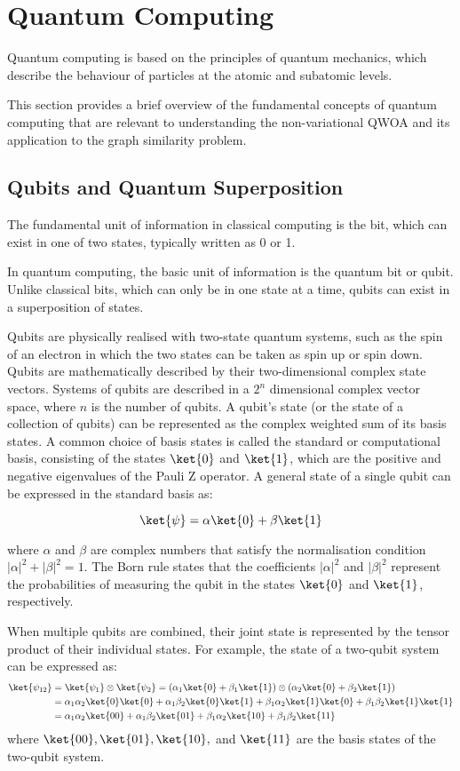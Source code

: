 \section{Quantum Computing}
Quantum computing is based on the principles of quantum mechanics, which describe the behaviour of particles at the atomic and subatomic levels.

This section provides a brief overview of the fundamental concepts of quantum computing that are relevant to understanding the non-variational QWOA and its application to the graph similarity problem. 

\subsection{Qubits and Quantum Superposition}

The fundamental unit of information in classical computing is the bit, which can exist in one of two states, typically written as 0 or 1.

In quantum computing, the basic unit of information is the quantum bit or qubit. Unlike classical bits, which can only be in one state at a time, qubits can exist in a superposition of states.

Qubits are physically realised with two-state quantum systems, such as the spin of an electron in which the two states can be taken as spin up or spin down. Qubits are mathematically described by their two-dimensional complex state vectors. Systems of qubits are described in a $2^n$ dimensional complex vector space, where $n$ is the number of qubits. A qubit's state (or the state of a collection of qubits) can be represented as the complex weighted sum of its basis states. A common choice of basis states is called the standard or computational basis, consisting of the states $\ket{0}$ and $\ket{1}$, which are the positive and negative eigenvalues of the Pauli Z operator. A general state of a single qubit can be expressed in the standard basis as:

$$\ket{\psi} = \alpha\ket{0} + \beta\ket{1}$$

where $\alpha$ and $\beta$ are complex numbers that satisfy the normalisation condition $|\alpha|^2 + |\beta|^2 = 1$. The Born rule states that the coefficients $|\alpha|^2$  and $|\beta|^2$ represent the probabilities of measuring the qubit in the states $\ket{0}$ and $\ket{1}$, respectively.

When multiple qubits are combined, their joint state is represented by the tensor product of their individual states. For example, the state of a two-qubit system can be expressed as:
\begin{align*}
\ket{\psi_{12}} &= \ket{\psi_1} \otimes \ket{\psi_2} = (\alpha_1\ket{0} + \beta_1\ket{1}) \otimes (\alpha_2\ket{0} + \beta_2\ket{1})\\
&=\alpha_1\alpha_2\ket{0}\ket{0} + \alpha_1\beta_2\ket{0}\ket{1} + \beta_1\alpha_2\ket{1}\ket{0} + \beta_1\beta_2\ket{1}\ket{1}\\
&= \alpha_1\alpha_2\ket{00} + \alpha_1\beta_2\ket{01} + \beta_1\alpha_2\ket{10} + \beta_1\beta_2\ket{11}
\end{align*}
where $\ket{00}, \ket{01}, \ket{10},$ and $\ket{11}$ are the basis states of the two-qubit system.

